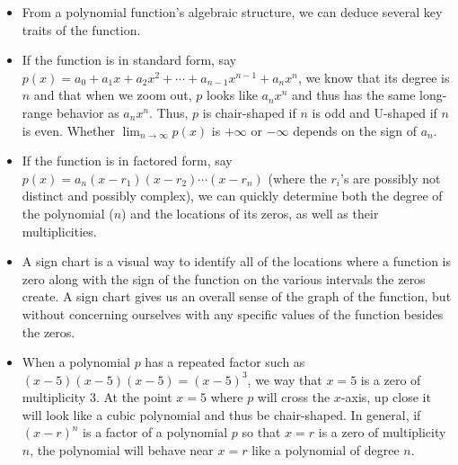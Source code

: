 \documentclass{ximera}
\begin{document}
%
%
%
\begin{summary}\begin{itemize}
\item From a polynomial function's algebraic structure, we can deduce several key traits of the function.%
\item If the function is in standard form, say $p(x) = a_0 + a_1 x + a_2 x^2 + \cdots + a_{n-1}x^{n-1} + a_n x^n$, we know that its degree is $n$ and that when we zoom out, $p$ looks like $a_n x^n$ and thus has the same long-range behavior as $a_n x^n$.  Thus, $p$ is chair-shaped if $n$ is odd and U-shaped if $n$ is even.  Whether $\lim_{n \to \infty} p(x)$ is $+\infty$ or $-\infty$ depends on the sign of $a_n$.%
\item If the function is in factored form, say $p(x) = a_n(x-r_1)(x-r_2) \cdots (x-r_n)$ (where the $r_i$'s are possibly not distinct and possibly complex), we can quickly determine both the degree of the polynomial ($n$) and the locations of its zeros, as well as their multiplicities.%
\item A sign chart is a visual way to identify all of the locations where a function is zero along with the sign of the function on the various intervals the zeros create.  A sign chart gives us an overall sense of the graph of the function, but without concerning ourselves with any specific values of the function besides the zeros.%
\item When a polynomial $p$ has a repeated factor such as $(x-5)(x-5)(x-5) = (x-5)^3$, we way that $x = 5$ is a zero of multiplicity $3$.  At the point $x = 5$ where $p$ will cross the $x$-axis, up close it will look like a cubic polynomial and thus be chair-shaped.  In general, if $(x-r)^n$ is a factor of a polynomial $p$ so that $x = r$ is a zero of multiplicity $n$, the polynomial will behave near $x = r$ like a polynomial of degree $n$.%
\end{itemize}\end{summary}
\end{document}

